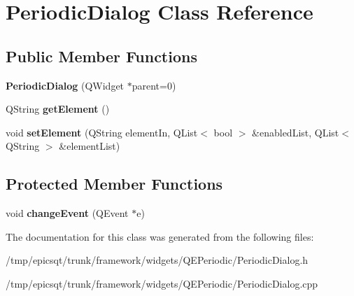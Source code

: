 \hypertarget{classPeriodicDialog}{
\section{PeriodicDialog Class Reference}
\label{classPeriodicDialog}
}
\subsection*{Public Member Functions}
\begin{DoxyCompactItemize}
\item 
\hypertarget{classPeriodicDialog_a0b80d1a3ee6bc4093443ace6df669a5f}{
{\bfseries PeriodicDialog} (QWidget $\ast$parent=0)}
\label{classPeriodicDialog_a0b80d1a3ee6bc4093443ace6df669a5f}

\item 
\hypertarget{classPeriodicDialog_a41537b40e44672d232ae40db67002a46}{
QString {\bfseries getElement} ()}
\label{classPeriodicDialog_a41537b40e44672d232ae40db67002a46}

\item 
\hypertarget{classPeriodicDialog_a91d6d64e65968baf3d79a8dd8a530520}{
void {\bfseries setElement} (QString elementIn, QList$<$ bool $>$ \&enabledList, QList$<$ QString $>$ \&elementList)}
\label{classPeriodicDialog_a91d6d64e65968baf3d79a8dd8a530520}

\end{DoxyCompactItemize}
\subsection*{Protected Member Functions}
\begin{DoxyCompactItemize}
\item 
\hypertarget{classPeriodicDialog_a19b89ad736f22b9bf27301878aa18c48}{
void {\bfseries changeEvent} (QEvent $\ast$e)}
\label{classPeriodicDialog_a19b89ad736f22b9bf27301878aa18c48}

\end{DoxyCompactItemize}


The documentation for this class was generated from the following files:\begin{DoxyCompactItemize}
\item 
/tmp/epicsqt/trunk/framework/widgets/QEPeriodic/PeriodicDialog.h\item 
/tmp/epicsqt/trunk/framework/widgets/QEPeriodic/PeriodicDialog.cpp\end{DoxyCompactItemize}
